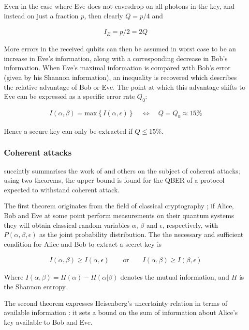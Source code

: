 \documentclass[paper=a4, fontsize=11pt]{scrartcl} %
\numberwithin{equation}{section} %
\numberwithin{figure}{section} %
\numberwithin{table}{section} %
\begin{document}
Even in the case where Eve does not eavesdrop on all photons in the key, and instead on just a fraction $p$,
then clearly $Q = p/4$ and

\begin{align}
I_E	= p/2 = 2Q
\end{align}

More errors in the received qubits can then be assumed in worst case to be an increase in Eve's information,
along with a corresponding decrease in Bob's information. When Eve's maximal information is compared with Bob's error
(given by his Shannon information), an inequality is recovered which describes the relative advantage of Bob or Eve.
The point at which this advantage shifts to Eve can be expressed as a specific error rate $Q_0$:

\begin{align}
	I(\alpha, \beta) = \mathrm{max} \left\{ I(\alpha, \epsilon) \right\}
	\quad
	\Leftrightarrow
	\quad
	Q = Q_0
	\approx 15\%
\end{align}

Hence a secure key can only be extracted if $Q \leq 15\%$. \citep{qber15proof, gisin2002, huttner1995}

\subsubsection{Coherent attacks}
\citet{gisin2002} succintly summarises the work of \citet{proofBB84} and others
on the subject of coherent attacks; using two theorems, the upper bound is found for the QBER
of a protocol expected to withstand coherent attack.

The first theorem originates from the field of classical
cryptography \citep{csiszarAssump}; if Alice, Bob and Eve
at some point perform measurements on their quantum systems
they will obtain classical random variables $\alpha$, $\beta$
and $\epsilon$, respectively, with $P(\alpha, \beta, \epsilon)$ as the
joint probability distribution. The the necessary and sufficient condition
for Alice and Bob to extract a secret key is

\begin{align}
	I(\alpha, \beta) \geq I(\alpha, \epsilon)
	\qquad
	\mathrm{or}
	\qquad
	I(\alpha, \beta) \geq I(\beta, \epsilon)
\end{align}

Where $I(\alpha, \beta) = H(\alpha) - H(\alpha | \beta)$ denotes the mutual information,
and $H$ is the Shannon entropy.

The second theorem expresses Heisenberg's uncertainty relation in terms of available information
\citep{hall1995}: it sets a bound on the sum of information about Alice's key available to Bob
and Eve.
\end{document}
